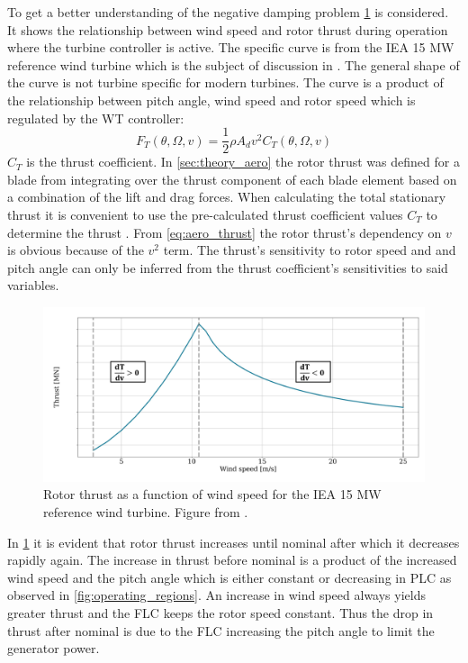 \smallskip
To get a better understanding of the negative damping problem \cref{fig:thrust_vs_windspeed} is considered. It shows the relationship between wind speed and rotor thrust during operation where the turbine controller is active. The specific curve is from the IEA 15 MW reference wind turbine which is the subject of discussion in \cite{Vanelli2021}. The general shape of the curve is not turbine specific for modern turbines. The curve is a product of the relationship between pitch angle, wind speed and rotor speed which is regulated by the WT controller:
\begin{equation} \label{eq:aero_thrust}
	F_T(\theta, \Omega, v) = \dfrac{1}{2} \rho A_d v^2 C_T(\theta, \Omega, v)
\end{equation}
$ C_T $ is the thrust coefficient. In \cref{sec:theory_aero} the rotor thrust was defined for a blade from integrating over the thrust component of each blade element based on a combination of the lift and drag forces. When calculating the total stationary thrust it is convenient to use the pre-calculated thrust coefficient values $ C_T $ to determine the thrust \cite{Knudsen2013}. From \cref{eq:aero_thrust} the rotor thrust's dependency on $ v $ is obvious because of the $ v^2 $ term. The thrust's sensitivity to rotor speed and and pitch angle can only be inferred from the thrust coefficient's sensitivities to said variables. 
\begin{figure}[ht]
	\centering
	\includegraphics[width=0.85\linewidth]{Graphics/ThrustWindpeedCurve.PNG}
	\caption{Rotor thrust as a function of wind speed for the IEA 15 MW reference wind turbine. Figure from \cite{Vanelli2021}.}
	\label{fig:thrust_vs_windspeed}
\end{figure}
In \cref{fig:thrust_vs_windspeed} it is evident that rotor thrust increases until nominal after which it decreases rapidly again. The increase in thrust before nominal is a product of the increased wind speed and the pitch angle which is either constant or decreasing in PLC as observed in \cref{fig:operating_regions}. An increase in wind speed always yields greater thrust and the FLC keeps the rotor speed constant. Thus the drop in thrust after nominal is due to the FLC increasing the pitch angle to limit the generator power.

